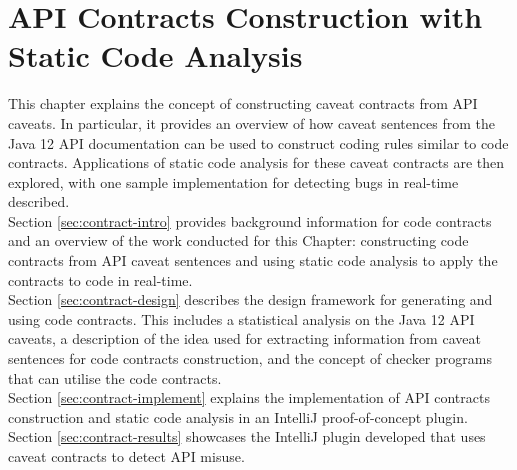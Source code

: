 \chapter{API Contracts Construction with Static Code Analysis}
\label{cha:codeAnalysis}
This chapter explains the concept of constructing caveat contracts from API caveats. In particular, it provides an overview of how caveat sentences from the Java 12 API documentation can be used to construct coding rules similar to code contracts. Applications of static code analysis for these caveat contracts are then explored, with one sample implementation for detecting bugs in real-time described.\\

\noindent
Section \ref{sec:contract-intro} provides background information for code contracts and an overview of the work conducted for this Chapter: constructing code contracts from API caveat sentences and using static code analysis to apply the contracts to code in real-time. \\

\noindent
Section \ref{sec:contract-design} describes the design framework for generating and using code contracts. This includes a statistical analysis on the Java 12 API caveats, a description of the idea used for extracting information from caveat sentences for code contracts construction, and the concept of checker programs that can utilise the code contracts. \\

\noindent
Section \ref{sec:contract-implement} explains the implementation of API contracts construction and static code analysis in an IntelliJ proof-of-concept plugin. \\

\noindent
Section \ref{sec:contract-results} showcases the IntelliJ plugin developed that uses caveat contracts to detect API misuse. 

